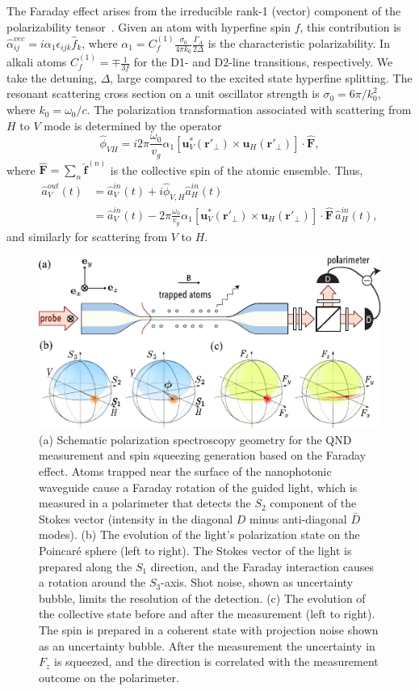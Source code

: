 \documentclass[aps,pra,twocolumn,superscriptaddress]{revtex4-1} %
\newcommand{\nn}{\nonumber}
\newcommand{\mbf}[1]{\mathbf{#1}}
\newcommand{\Poincare}{Poincar\'e\xspace}
\begin{document}
The Faraday effect arises from the irreducible rank-1 (vector) component of the polarizability tensor~\cite{Deutsch2010a}.  Given an atom with hyperfine spin $f$, this contribution is $\hat{\alpha}^{vec}_{ij} = i \alpha_1 \epsilon_{ijk} \hat{f}_k$, where $\alpha_1 = C^{(1)}_{f}\frac{\sigma_0}{4\pi k_0}\frac{\Gamma_A}{2\Delta} $ is the characteristic polarizability.  In alkali atoms $C^{(1)}_f=\mp\frac{1}{3f}$ for the D1- and D2-line transitions, respectively.  We take the detuning, $ \Delta $, large compared to the excited state hyperfine splitting.  The resonant scattering cross section on a unit oscillator strength is $\sigma_0 = 6\pi/k_0^2$, where $k_0=\omega_0/c$.  The polarization transformation associated with scattering from $H$ to $V$ mode is determined by the operator
\begin{equation}
\hat{\phi}_{VH} = i 2\pi \frac{\omega_0}{v_g}\alpha_1 \left[ \mbf{u}^*_V (\mbf{r}'_\perp) \times  \mbf{u}_{H} (\mbf{r}'_\perp) \right] \cdot \hat{\mbf{F}},
\end{equation}
where $\hat{\mbf{F}}=\sum_n \hat{\mbf{f}}^{(n)}$ is the collective spin of the atomic ensemble.  Thus,
\begin{align}
\hat{a}^{out}_V(t) &= \hat{a}^{in}_V(t)  +i  \hat{\phi}_{V,H} \hat{a}^{in}_{H}(t)\nn\\
&= \hat{a}^{in}_V(t) \!-\! 2\pi\! \frac{\omega_0}{v_g}\alpha_1\! \left[ \mbf{u}^*_V (\!\mbf{r}'_\perp\!) \!\!\times\!\!  \mbf{u}_{H}(\!\mbf{r}'_\perp\!)\right]  \!\cdot\! \hat{\mbf{F}}\, \hat{a}^{in}_{H}(t),\label{eq:aoutain}
\end{align}
 and similarly for scattering from $V$ to $H$.

\begin{figure}[t]
\centering
  \includegraphics[width=.45\textwidth]{fig/FaradaySchematics}
  \caption{(a) Schematic polarization spectroscopy geometry for the QND measurement and spin squeezing generation based on the Faraday effect.  Atoms trapped near the surface of the nanophotonic waveguide cause a Faraday rotation of the guided light, which is measured in a polarimeter that detects the $S_2$ component of the Stokes vector (intensity in the diagonal $D$ minus anti-diagonal $\bar{D}$ modes).  (b) The evolution of the light's polarization state on the \Poincare sphere  (left to right).  The Stokes vector of the light is prepared along the $S_1$ direction, and the Faraday interaction causes a rotation around the $S_3$-axis.  Shot noise, shown as uncertainty bubble, limits the resolution of the detection. (c) The evolution of the collective state before and after the measurement (left to right).  The spin is prepared in a coherent state with projection noise shown as an uncertainty bubble.  After the measurement the uncertainty in $F_z$ is squeezed, and the direction is correlated with the measurement outcome on the polarimeter. }\label{fig:spinsqueezingschematic}
\end{figure}
\end{document}
